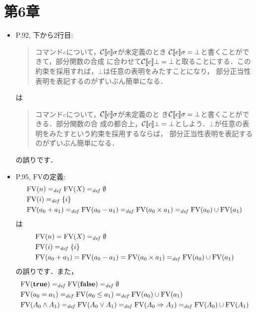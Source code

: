 \documentclass[12pt,titlepage,twoside,openright,dvipdfmx]{jsbook}
\theoremstyle{definition}
\begin{document}
\section*{第6章}

\begin{itemize}
\item P.92, 下から2行目:
  \begin{quote}
    コマンド$c$について，$\mathcal{C}\llbracket{c}\rrbracket\sigma$が未定義のとき
    $\mathcal{C}\llbracket{c}\rrbracket\sigma = \bot$と書くことができて，部分関数の合成
    に合わせて$\mathcal{C}\llbracket{c}\rrbracket\bot = \bot$と取ることにする．この
    約束を採用すれば，$\bot$は任意の表明をみたすことになり，
    部分正当性表明を表記するのがずいぶん簡単になる．
  \end{quote}
  は
  \begin{quote}
    コマンド$c$について，$\mathcal{C}\llbracket{c}\rrbracket\sigma$が未定義のと
    き$\mathcal{C}\llbracket{c}\rrbracket\sigma = \bot$と書くことができる．部分関数の合
    成の都合上，$\mathcal{C}\llbracket{c}\rrbracket\bot =
    \bot$としよう．$\bot$が任意の表明をみたすという約束を採用するならば，
    部分正当性表明を表記するのがずいぶん簡単になる．
  \end{quote}
  の誤りです．
\item P.95, $\mathrm{FV}$の定義:
  \begin{align*}
    & \mathrm{FV}(n) =_{\mathit{def}} \mathrm{FV}(X) =_{\mathit{def}} \emptyset \\
    & \mathrm{FV}(i) =_{\mathit{def}} \{i\} \\
    & \mathrm{FV}(a_0 + a_1) =_{\mathit{def}} \mathrm{FV}(a_0 - a_1) =_{\mathit{def}} \mathrm{FV}(a_0 \times a_1) =_{\mathit{def}} \mathrm{FV}(a_0) \cup \mathrm{FV}(a_1)\\
  \end{align*}
  は
  \begin{align*}
    & \mathrm{FV}(n) = \mathrm{FV}(X) =_{\mathit{def}} \emptyset \\
    & \mathrm{FV}(i) =_{\mathit{def}} \{i\} \\
    & \mathrm{FV}(a_0 + a_1) = \mathrm{FV}(a_0 - a_1) = \mathrm{FV}(a_0 \times a_1) =_{\mathit{def}} \mathrm{FV}(a_0) \cup \mathrm{FV}(a_1)\\
  \end{align*}
  の誤りです．また，
  \begin{align*}
    & \FV{\Ttrue} =_{\mathit{def}} \FV{\Tfalse} =_{\mathit{def}} \emptyset \\
    & \FV{a_0 = a_1} =_{\mathit{def}} \FV{a_0 \leq a_1} =_{\mathit{def}} \FV{a_0} \cup \FV{a_1} \\
    & \FV{A_0 \wedge A_1} =_{\mathit{def}} \FV{A_0 \vee A_1} =_{\mathit{def}} \FV{A_0 \Rightarrow A_1} =_{\mathit{def}} \FV{A_0} \cup \FV{A_1} \\

\end{align*}
\end{itemize}
\end{document}
